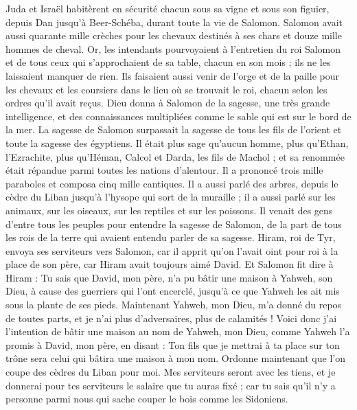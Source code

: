 \begin{multicols}{2}
Juda et Israël habitèrent en sécurité chacun sous sa vigne et sous son figuier, depuis Dan jusqu'à Beer-Schéba, durant toute la vie de Salomon.
Salomon avait aussi quarante mille crèches pour les chevaux destinés à ses chars et douze mille hommes de cheval.
Or, les intendants pourvoyaient à l’entretien du roi Salomon et de tous ceux qui s'approchaient de sa table, chacun en son mois ; ils ne les laissaient manquer de rien.
Ils faisaient aussi venir de l'orge et de la paille pour les chevaux et les coursiers dans le lieu où se trouvait le roi, chacun selon les ordres qu'il avait reçus.
Dieu donna à Salomon de la sagesse, une très grande intelligence, et des connaissances multipliées comme le sable qui est sur le bord de la mer.
La sagesse de Salomon surpassait la sagesse de tous les fils de l’orient et toute la sagesse des égyptiens.
Il était plus sage qu’aucun homme, plus qu'Ethan, l’Ezrachite, plus qu'Héman, Calcol et Darda, les fils de Machol ; et sa renommée était répandue parmi toutes les nations d'alentour.
Il a prononcé trois mille paraboles et composa cinq mille cantiques.
Il a aussi parlé des arbres, depuis le cèdre du Liban jusqu'à l'hysope qui sort de la muraille ; il a aussi parlé sur les animaux, sur les oiseaux, sur les reptiles et sur les poissons.
Il venait des gens d'entre tous les peuples pour entendre la sagesse de Salomon, de la part de tous les rois de la terre qui avaient entendu parler de sa sagesse.
\VerseOne{}Hiram, roi de Tyr, envoya ses serviteurs vers Salomon, car il apprit qu'on l'avait oint pour roi à la place de son père, car Hiram avait toujours aimé David.
Et Salomon fit dire à Hiram :
Tu sais que David, mon père, n'a pu bâtir une maison à Yahweh, son Dieu, à cause des guerriers qui l'ont encerclé, jusqu'à ce que Yahweh les ait mis sous la plante de ses pieds.
Maintenant Yahweh, mon Dieu, m'a donné du repos de toutes parts, et je n'ai plus d’adversaires, plus de calamités !
Voici donc j’ai l’intention de bâtir une maison au nom de Yahweh, mon Dieu, comme Yahweh l’a promis à David, mon père, en disant : Ton fils que je mettrai à ta place sur ton trône sera celui qui bâtira une maison à mon nom.
Ordonne maintenant que l’on coupe des cèdres du Liban pour moi. Mes serviteurs seront avec les tiens, et je donnerai pour tes serviteurs le salaire que tu auras fixé ; car tu sais qu'il n'y a personne parmi nous qui sache couper le bois comme les Sidoniens.

\end{multicols}
